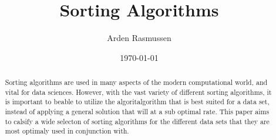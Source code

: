 \documentclass[10pt]{article}
\title{Sorting Algorithms}
\author{Arden Rasmussen}
\date{\today}
\begin{document}
\maketitle
\newpage
\pagestyle{toc}
\dosecttoc
\tableofcontents
\newpage
\pagestyle{abs}
\begin{abstract}
  Sorting algorithms are used in many aspects of the modern computational
  world, and vital for data sciences. However, with the vast variety of
  different sorting algorithms, it is important to beable to utilize the
  algoritalgorithm that is best suited for a data set, instead of applying a
  general solution that will at a sub optimal rate. This paper aims to calsify
  a wide selecton of sorting algorithms for the different data sets that they
  are most optimaly used in conjunction with.
\end{abstract}
\newpage
\pagestyle{doc}

\newpage

\end{document}
